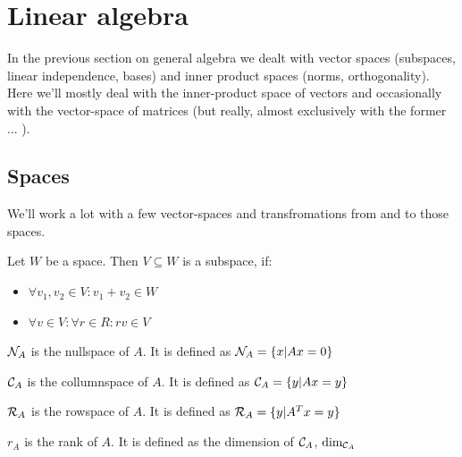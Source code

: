 \section{Linear algebra}

In the previous section on general algebra we dealt with vector spaces (subspaces, linear independence, bases) and inner product spaces (norms, orthogonality). 
Here we'll mostly deal with the inner-product space of vectors and occasionally with the vector-space of matrices (but really, almost exclusively with the former ... ).




\subsection{Spaces}

We'll work a lot with a few vector-spaces and transfromations from and to those spaces. 

\begin{definition}
    Let $W$ be a space. Then $V \subseteq W$ is a subspace, if: 
    \begin{itemize}
        \item $\forall v_1, v_2 \in V: v_1 + v_2 \in W$
        \item $\forall v \in V: \forall r \in R: rv \in V$
    \end{itemize}
\end{definition}
    

\begin{definition}[Nullspace]
     $\mathcal{N}_{A}$ is the nullspace of $A$. It is defined as $\mathcal{N}_{A} = \{ x | Ax = 0 \}$
\end{definition}

\begin{definition}[Columnspace]
     $\mathcal{C}_{A}$ is the collumnspace of $A$. It is defined as $\mathcal{C}_{A} = \{ y | Ax = y \}$
\end{definition}

\begin{definition}[Rowspace]
     $\mathcal{R}_{A}$ is the rowspace of $A$. It is defined as $\mathcal{R}_{A} = \{ y | A^Tx = y \}$
\end{definition}

\begin{definition}[Rank]
     $r_A$ is the rank of $A$. It is defined as the dimension of $\mathcal{C}_{A}$, $\text{dim}_{\mathcal{C}_{A}}$
\end{definition}

